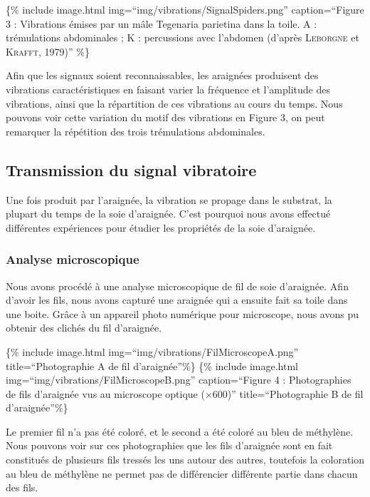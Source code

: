 \{\% include image.html img=``img/vibrations/SignalSpiders.png''
caption=``Figure 3 : Vibrations émises par un mâle Tegenaria parietina
dans la toile. A : trémulations abdominales ; K : percussions avec
l'abdomen (d'après \textsc{Leborgne} et \textsc{Krafft}, 1979)'' \%\}

Afin que les signaux soient reconnaissables, les araignées produisent
des vibrations caractéristiques en faisant varier la fréquence et
l'amplitude des vibrations, ainsi que la répartition de ces vibrations
au cours du temps. Nous pouvons voir cette variation du motif des
vibrations en Figure 3, on peut remarquer la répétition des trois
trémulations abdominales.

\subsection{Transmission du signal
vibratoire}\label{transmission-du-signal-vibratoire}

Une fois produit par l'araignée, la vibration se propage dans le
substrat, la plupart du temps de la soie d'araignée. C'est pourquoi nous
avons effectué différentes expériences pour étudier les propriétés de la
soie d'araignée.

\subsubsection{Analyse microscopique}\label{analyse-microscopique}

Nous avons procédé à une analyse microscopique de fil de soie
d'araignée. Afin d'avoir les fils, nous avons capturé une araignée qui a
ensuite fait sa toile dans une boite. Grâce à un appareil photo
numérique pour microscope, nous avons pu obtenir des clichés du fil
d'araignée.

\{\% include image.html img=``img/vibrations/FilMicroscopeA.png''
title=``Photographie A de fil d'araignée''\%\} \{\% include image.html
img=``img/vibrations/FilMicroscopeB.png'' caption=``Figure 4 :
Photographies de fils d'araignée vus au microscope optique (×600)''
title=``Photographie B de fil d'araignée''\%\}

Le premier fil n'a pas été coloré, et le second a été coloré au bleu de
méthylène. Nous pouvons voir sur ces photographies que les fils
d'araignée sont en fait constitués de plusieurs fils tressés les uns
autour des autres, toutefois la coloration au bleu de méthylène ne
permet pas de différencier différente partie dans chacun des fils.

